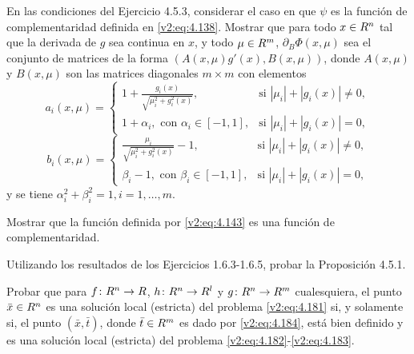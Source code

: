 \begin{exercise}\label{v2:ejer:4.5.4}
    En las condiciones del Ejercicio 4.5.3, considerar el caso en que $\psi$ es la función de complementaridad definida en \eqref{v2:eq:4.138}.
    Mostrar que para todo $x \in R^n$ tal que la derivada de $g$ sea continua en $x$, y todo $\mu \in R^m$, $\partial_B \Phi(x, \mu)$ sea el conjunto de matrices de la forma $(A(x, \mu)g'(x), B(x, \mu))$, donde $A(x, \mu)$ y $B(x, \mu)$ son las matrices diagonales $m \times m$ con elementos
    \begin{equation}
        a_i(x, \mu) = \begin{cases}
            1 + \frac{g_i(x)}{\sqrt{\mu_i^2 + g_i^2(x)}}, & \text{si } |\mu_i| + |g_i(x)| \neq 0, \\
            1 + \alpha_i, \text{ con } \alpha_i \in [-1, 1], & \text{si } |\mu_i| + |g_i(x)| = 0,
        \end{cases}
        \label{v2:eq:4.140}
    \end{equation}
    \begin{equation}
        b_i(x, \mu) = \begin{cases}
            \frac{\mu_i}{\sqrt{\mu_i^2 + g_i^2(x)}} - 1, & \text{si } |\mu_i| + |g_i(x)| \neq 0, \\
            \beta_i - 1, \text{ con } \beta_i \in [-1, 1], & \text{si } |\mu_i| + |g_i(x)| = 0,
        \end{cases}
        \label{v2:eq:4.141}
    \end{equation}
    y se tiene $\alpha_i^2 + \beta_i^2 = 1, i = 1, \dots, m$.
\end{exercise}

\begin{exercise}\label{v2:ejer:4.5.5}
    Mostrar que la función definida por \eqref{v2:eq:4.143} es una función de complementaridad.
\end{exercise}

\begin{exercise}\label{v2:ejer:4.5.6}
    Utilizando los resultados de los Ejercicios 1.6.3-1.6.5, probar la Proposición 4.5.1.
\end{exercise}

\begin{exercise}\label{v2:ejer:4.5.7}
    Probar que para $f \colon R^n \to R$, $h \colon R^n \to R^l$ y $g \colon R^n \to R^m$ cualesquiera, el punto $\bar{x} \in R^n$ es una solución local (estricta) del problema \eqref{v2:eq:4.181} si, y solamente si, el punto $(\bar{x}, \bar{t})$, donde $\bar{t} \in R^m$ es dado por \eqref{v2:eq:4.184}, está bien definido y es una solución local (estricta) del problema \eqref{v2:eq:4.182}-\eqref{v2:eq:4.183}.
\end{exercise}

